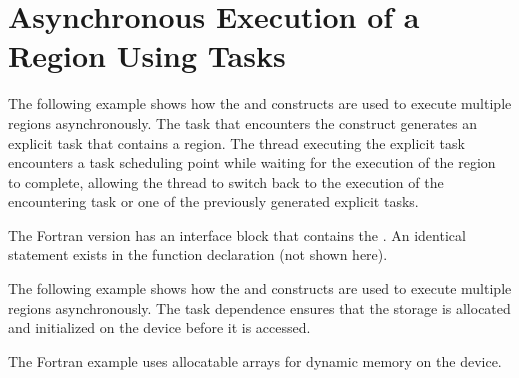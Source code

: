 \pagebreak
\chapter{Asynchronous Execution of a  Region Using Tasks}
\label{chap:async_target}

The following example shows how the  and  constructs 
are used to execute multiple  regions asynchronously. The task that 
encounters the  construct generates an explicit task that contains 
a  region. The thread executing the explicit task encounters a task 
scheduling point while waiting for the execution of the  region 
to complete, allowing the thread to switch back to the execution of the encountering 
task or one of the previously generated explicit tasks.


The Fortran version has an interface block that contains the  . 
An identical statement exists in the function declaration (not shown here).


The following example shows how the  and  constructs 
are used to execute multiple  regions asynchronously. The task dependence 
ensures that the storage is allocated and initialized on the device before it is 
accessed.


The Fortran example uses allocatable arrays for dynamic memory on the device. 



